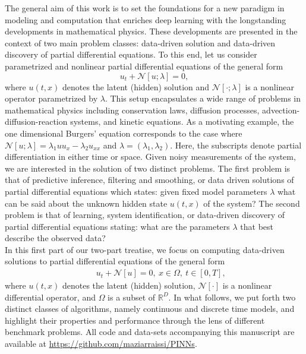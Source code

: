 \documentclass[preprint,12pt]{elsarticle}
\begin{document}
The general aim of this work is to set the foundations for a new paradigm in modeling and computation that enriches deep learning with the longstanding developments in mathematical physics. These developments are presented in the context of two main problem classes: data-driven solution and data-driven discovery of partial differential equations. To this end, let us consider parametrized and nonlinear partial differential equations of the general form
\begin{equation*}
u_t + \mathcal{N}[u;\lambda] = 0,
\end{equation*}
where $u(t,x)$ denotes the latent (hidden) solution and $\mathcal{N}[\cdot;\lambda]$ is a nonlinear operator parametrized by $\lambda$. This setup encapsulates a wide range of problems in mathematical physics including conservation laws, diffusion processes, advection-diffusion-reaction systems, and kinetic equations. As a motivating example, the one dimensional Burgers' equation \cite{basdevant1986spectral} corresponds to the case where $\mathcal{N}[u;\lambda] = \lambda_1 u u_x - \lambda_2 u_{xx}$ and $\lambda = (\lambda_1, \lambda_2)$. Here, the subscripts denote partial differentiation in either time or space. Given noisy measurements of the system, we are interested in the solution of two distinct problems. The first problem is that of predictive inference, filtering and smoothing, or data driven solutions of partial differential equations \cite{raissi2017numerical, raissi2017inferring} which states: given fixed model parameters $\lambda$ what can be said about the unknown hidden state $u(t,x)$ of the system? The second problem is that of learning, system identification, or data-driven discovery of partial differential equations \cite{raissi2017hidden,raissi2017machine, Rudye1602614} stating: what are the parameters $\lambda$ that best describe the observed data?\\

In this first part of our two-part treatise, we focus on computing data-driven solutions to partial differential equations of the general form
\begin{eqnarray}\label{eq:PDE}
&&u_t + \mathcal{N}[u] = 0,\ x \in \Omega, \ t\in[0,T],
\end{eqnarray}
where $u(t,x)$ denotes the latent (hidden) solution, $\mathcal{N}[\cdot]$ is a nonlinear differential operator, and $\Omega$ is a subset of $\mathbb{R}^D$. In what follows, we put forth two distinct classes of algorithms, namely continuous and discrete time models, and highlight their properties and performance through the lens of different benchmark problems. All code and data-sets accompanying this manuscript are available at \url{https://github.com/maziarraissi/PINNs}.
\end{document}
